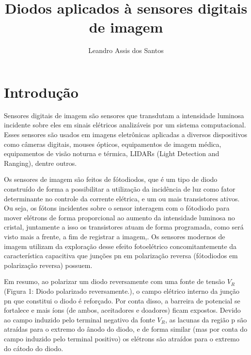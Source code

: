 \documentclass[11pt,a4paper,twocolumn]{article}
\title{\textbf{Diodos aplicados à sensores digitais de imagem}}
\author{Leandro Assis dos Santos}
\begin{document}
\maketitle

\section*{Introdução}
		Sensores digitais de imagem são sensores que transdutam a intensidade luminosa incidente sobre eles em sinais elétricos analizáveis por um sistema computacional. Esses sensores são usados em imagens eletrônicas aplicadas a diversos dispositivos como câmeras digitais, mouses ópticos, equipamentos de imagem médica, equipamentos de visão noturna e térmica, LIDARs (Light Detection and Ranging), dentre outros.
				
		Os sensores de imagem são feitos de fótodiodos, que é um tipo de diodo construído de forma a possibilitar a utilização da incidência de luz como fator determinante no controle da corrente elétrica, e um ou mais transistores ativos. Ou seja, os fótons incidentes sobre o sensor interagem com o fótodiodo para mover elétrons de forma proporcional ao aumento da intensidade luminosa no cristal, juntamente a isso os transistores atuam de forma programada, como será visto mais a frente, a fim de registrar a imagem,. Os sensores modernos de imagem utilizam da exploração desse efeito fotoelétrico concomitantemente da característica capacitiva que junções pn em polarização reversa (fótodiodos em polarização reversa) possuem. 
		
		Em resumo, ao polarizar um diodo reversamente com uma fonte de tensão $V_{R}$ (Figura 1: Diodo polarizado reversamente.), o campo elétrico interno da junção pn que constitui o diodo é reforçado. Por conta disso, a barreira de potencial se fortalece e mais íons (de ambos, aceitadores e doadores) ficam expostos. Devido ao campo induzido pelo terminal negativo da fonte $V_{R}$, as lacunas da região p são atraídas para o extremo do ânodo do diodo, e de forma similar (mas por conta do campo induzido pelo terminal positivo) os elétrons são atraídos para o extremo do cátodo do diodo.
		
\end{document}
